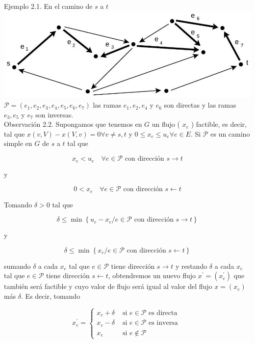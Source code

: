 \documentclass[10pt]{article}
\begin{document}
Ejemplo 2.1. En el camino de $s$ a $t$\\
\includegraphics[max width=\textwidth, center]{2025_09_05_aa5f7b8425e7dd302062g-03}\\
$\mathcal{P}=\left(e_{1}, e_{2}, e_{3}, e_{4}, e_{5}, e_{6}, e_{7}\right)$ las ramas $e_{1}, e_{2}, e_{4}$ y $e_{6}$ son directas y las ramas $e_{3}, e_{5}$ y $e_{7}$ son inversas.\\
Observación 2.2. Supongamos que tenemos en $G$ un flujo ( $x_{e}$ ) factible, es decir, tal que $x(v, V)-x(V, v)=0 \forall v \neq s, t$ y $0 \leq x_{e} \leq u_{e} \forall e \in E$. Si $\mathcal{P}$ es un camino simple en $G$ de $s$ a $t$ tal que

$$
x_{e}<u_{e} \quad \forall e \in \mathcal{P} \text { con dirección } s \longrightarrow t
$$

y

$$
0<x_{e} \quad \forall e \in \mathcal{P} \text { con dirección } s \longleftarrow t
$$

Tomando $\delta>0$ tal que

$$
\delta \leq \min \left\{u_{e}-x_{e} / e \in \mathcal{P} \text { con dirección } s \longrightarrow t\right\}
$$

y

$$
\delta \leq \min \left\{x_{e} / e \in \mathcal{P} \text { con dirección } s \longleftarrow t\right\}
$$

sumando $\delta$ a cada $x_{e}$ tal que $e \in \mathcal{P}$ tiene dirección $s \longrightarrow t$ y restando $\delta$ a cada $x_{e}$ tal que $e \in \mathcal{P}$ tiene dirección $s \longleftarrow t$, obtendremos un nuevo flujo $x^{\prime}=\left(x_{e}^{\prime}\right)$ que también será factible y cuyo valor de flujo será igual al valor del flujo $x=\left(x_{e}\right)$ más $\delta$. Es decir, tomando

$$
x_{e}^{\prime}= \begin{cases}x_{e}+\delta & \text { si } e \in \mathcal{P} \text { es directa } \\ x_{e}-\delta & \text { si } e \in \mathcal{P} \text { es inversa } \\ x_{e} & \text { si } e \notin \mathcal{P}\end{cases}
$$
\end{document}
